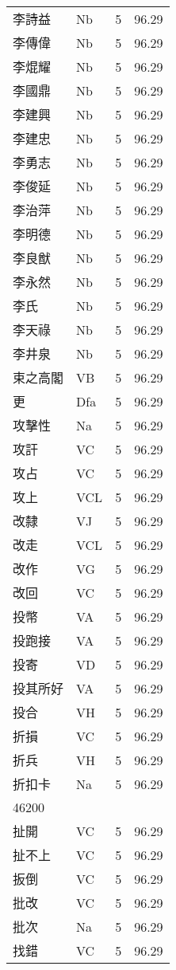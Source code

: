 \documentclass[twocolumn]{book}
\begin{document}
\begin{supertabular}{llrr}
李詩益 & Nb & 5 &  96.29\\
李傳偉 & Nb & 5 &  96.29\\
李焜耀 & Nb & 5 &  96.29\\
李國鼎 & Nb & 5 &  96.29\\
李建興 & Nb & 5 &  96.29\\
李建忠 & Nb & 5 &  96.29\\
李勇志 & Nb & 5 &  96.29\\
李俊延 & Nb & 5 &  96.29\\
李治萍 & Nb & 5 &  96.29\\
李明德 & Nb & 5 &  96.29\\
李良猷 & Nb & 5 &  96.29\\
李永然 & Nb & 5 &  96.29\\
李氏 & Nb & 5 &  96.29\\
李天祿 & Nb & 5 &  96.29\\
李井泉 & Nb & 5 &  96.29\\
束之高閣 & VB & 5 &  96.29\\
更 & Dfa & 5 &  96.29\\
攻擊性 & Na & 5 &  96.29\\
攻訐 & VC & 5 &  96.29\\
攻占 & VC & 5 &  96.29\\
攻上 & VCL & 5 &  96.29\\
改隸 & VJ & 5 &  96.29\\
改走 & VCL & 5 &  96.29\\
改作 & VG & 5 &  96.29\\
改回 & VC & 5 &  96.29\\
投幣 & VA & 5 &  96.29\\
投跑接 & VA & 5 &  96.29\\
投寄 & VD & 5 &  96.29\\
投其所好 & VA & 5 &  96.29\\
投合 & VH & 5 &  96.29\\
折損 & VC & 5 &  96.29\\
折兵 & VH & 5 &  96.29\\
折扣卡 & Na & 5 &  96.29\\
46200\\
扯開 & VC & 5 &  96.29\\
扯不上 & VC & 5 &  96.29\\
扳倒 & VC & 5 &  96.29\\
批改 & VC & 5 &  96.29\\
批次 & Na & 5 &  96.29\\
找錯 & VC & 5 &  96.29\\

\end{supertabular}
\end{document}
